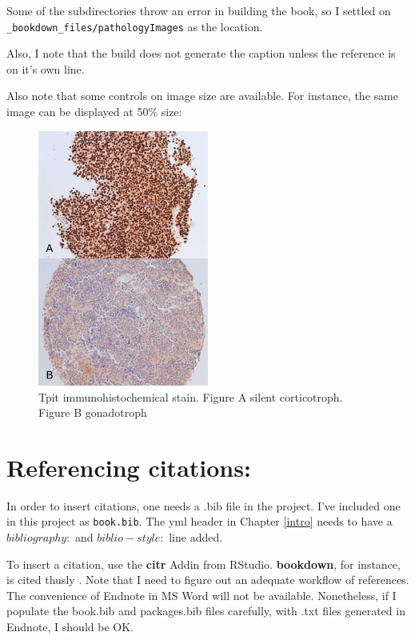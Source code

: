 \documentclass[]{book}
\begin{document}
Some of the subdirectories throw an error in building the book, so I settled on \texttt{\_bookdown\_files/pathologyImages} as the location.

Also, I note that the build does not generate the caption unless the reference is on it's own line.

Also note that some controls on image size are available. For instance, the same image can be displayed at 50\% size:

\begin{figure}
\hypertarget{id}{%
\centering
\includegraphics[width=0.5\textwidth,height=0.5\textheight]{_bookdown_files/pathologyImages/TpitIHC.jpg}
\caption{Tpit immunohistochemical stain. Figure A silent corticotroph. Figure B gonadotroph}\label{id}
}
\end{figure}

\hypertarget{referencing-citations}{%
\section{Referencing citations:}\label{referencing-citations}}

In order to insert citations, one needs a .bib file in the project. I've included one in this project as \texttt{book.bib}. The yml header in Chapter \ref{intro} needs to have a \(bibliography:\) and \(biblio-style:\) line added.

To insert a citation, use the \textbf{citr} Addin from RStudio. \textbf{bookdown}, for instance, is cited thusly \citep{R-bookdown}. Note that I need to figure out an adequate workflow of references. The convenience of Endnote in MS Word will not be available. Nonetheless, if I populate the book.bib and packages.bib files carefully, with .txt files generated in Endnote, I should be OK.
\end{document}
